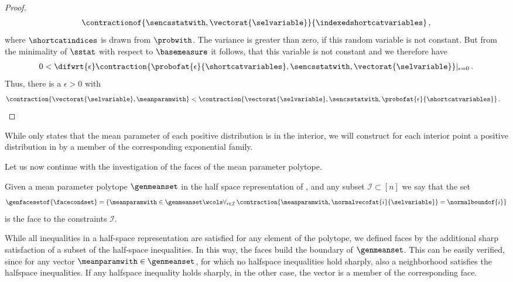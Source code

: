 \begin{proof}
\begin{align*}
        \contractionof{\sencsstatwith,\vectorat{\selvariable}}{\indexedshortcatvariables} \, ,
    \end{align*}
    where $\shortcatindices$ is drawn from $\probwith$.
    The variance is greater than zero, if this random variable is not constant.
    But from the minimality of $\sstat$ with respect to $\basemeasure$ it follows, that this variable is not constant and we therefore have
    \begin{align*}
        0 < \difwrt{\epsilon} \contraction{\probofat{\epsilon}{\shortcatvariables},\sencsstatwith,\vectorat{\selvariable}}|_{\epsilon=0} \, .
    \end{align*}
    Thus, there is a $\epsilon>0$ with
    \begin{align*}
        \contraction{\vectorat{\selvariable},\meanparamwith} < \contraction{\vectorat{\selvariable},\sencsstatwith,\probofat{\epsilon}{\shortcatvariables}} \, . & \qedhere
    \end{align*}
\end{proof}

%
While  only states that the mean parameter of each positive distribution is in the interior, we will construct for each interior point a positive distribution in  by a member of the corresponding exponential family.


Let us now continue with the investigation of the faces of the mean parameter polytope.%

\begin{definition}
    \label{def:meanPolytopeFaces}
    Given a mean parameter polytope $\genmeanset$ in the half space representation of , and any subset $\mathcal{I}\subset[n]$ we say that the set
    \begin{align*}
        \genfacesetof{\facecondset}
        = \left\{\meanparamwith\in\genmeanset \wcols \forall_{i\in\mathcal{I}} \, \contraction{\meanparamwith,\normalvecofat{i}{\selvariable}}=\normalboundof{i} \right\}
    \end{align*}
    is the face to the constraints $\mathcal{I}$.
\end{definition}

While all inequalities in a half-space representation are satisfied for any element of the polytope, we defined faces by the additional sharp satisfaction of a subset of the half-space inequalities.
In this way, the faces build the boundary of $\genmeanset$.
This can be easily verified, since for any vector $\meanparamwith\in\genmeanset$, for which no halfspace inequalities hold sharply, also a neighborhood satisfies the halfspace inequalities.
If any halfspace inequality holds sharply, in the other case, the vector is a member of the corresponding face.

